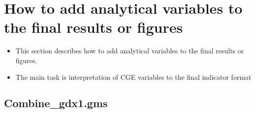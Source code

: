 \documentclass[10pt,a4paper,titlepage,dvipdfmx]{book}
\begin{document}
\section{\label{sec:HowAddAnaVarFinRes}How to add analytical variables to the final results or figures}


\begin{itemize}
\item This section describes how to add analytical variables to the final results or figures.
\item The main task is interpretation of CGE variables to the final indicator format
\end{itemize}
\subsection{\label{subsec:Com1}Combine\_gdx1.gms}
\end{document}
